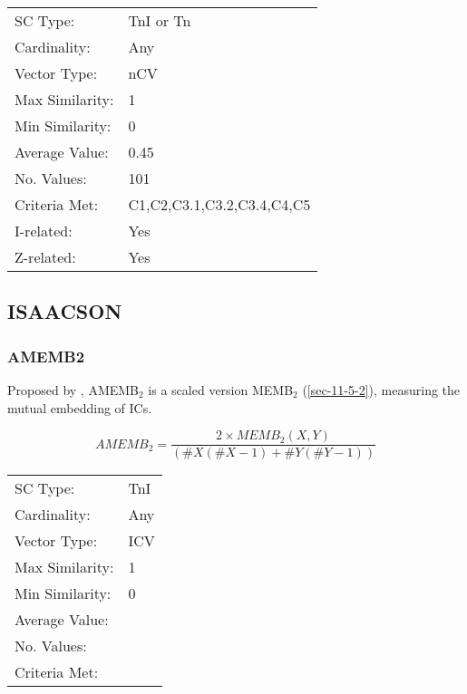 \documentclass{article}
\begin{document}
\begin{center}
\begin{tabular}{ll}
 SC Type:         &  TnI or Tn                   \\
 Cardinality:     &  Any                         \\
 Vector Type:     &  nCV                         \\
 Max Similarity:  &  1                           \\
 Min Similarity:  &  0                           \\
 Average Value:   &  0.45                        \\
 No. Values:      &  101                         \\
 Criteria Met:    &  C1,C2,C3.1,C3.2,C3.4,C4,C5  \\
 I-related:       &  Yes                         \\
 Z-related:       &  Yes                         \\
\end{tabular}
\end{center}
\subsection{ISAACSON}
\label{sec-11-6}
\subsubsection{AMEMB2}
\label{sec-11-6-1}

Proposed by \citet[pp. 8]{Isaacson1990}, AMEMB$_{2}$ is a scaled version
MEMB$_{2}$ (\ref{sec-11-5-2}), measuring the mutual embedding of ICs.

$$AMEMB_{2}=\frac{2 \times
MEMB_{2}(X,Y)}{\left(\#X\left(\#X-1\right)+\#Y\left(\#Y-1\right)\right)}$$

\begin{center}
\begin{tabular}{ll}
 SC Type:         &  TnI  \\
 Cardinality:     &  Any  \\
 Vector Type:     &  ICV  \\
 Max Similarity:  &  1    \\
 Min Similarity:  &  0    \\
 Average Value:   &       \\
 No. Values:      &       \\
 Criteria Met:    &       \\
\end{tabular}
\end{center}
\end{document}

